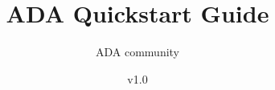 \documentclass[11pt]{book}
\title{ADA Quickstart Guide}
\author{ADA community}
\date{v1.0}
\begin{document}
\maketitle
\def\title#1{\chapter{#1}}
\tableofcontents

        
        
        
        
        
        
        
        
        
        
\end{document}
